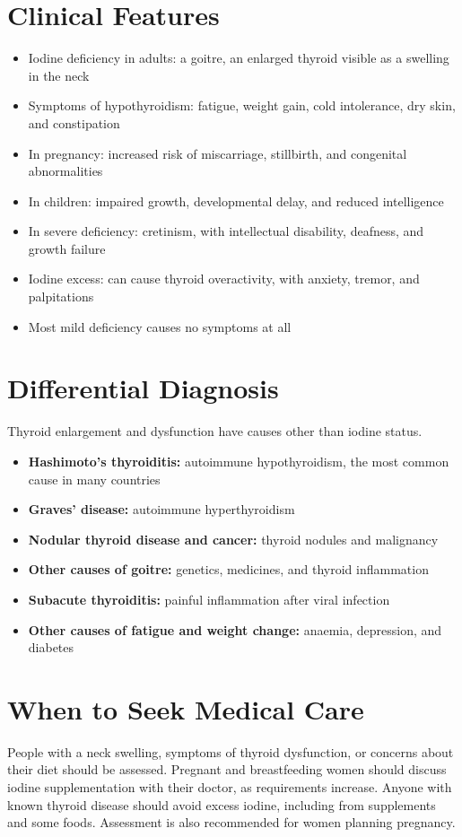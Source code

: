 \section*{Clinical Features}
\begin{itemize}
    \item Iodine deficiency in adults: a goitre, an enlarged thyroid visible as a swelling in the neck
    \item Symptoms of hypothyroidism: fatigue, weight gain, cold intolerance, dry skin, and constipation
    \item In pregnancy: increased risk of miscarriage, stillbirth, and congenital abnormalities
    \item In children: impaired growth, developmental delay, and reduced intelligence
    \item In severe deficiency: cretinism, with intellectual disability, deafness, and growth failure
    \item Iodine excess: can cause thyroid overactivity, with anxiety, tremor, and palpitations
    \item Most mild deficiency causes no symptoms at all
\end{itemize}

\section*{Differential Diagnosis}
Thyroid enlargement and dysfunction have causes other than iodine status.
\begin{itemize}
    \item \textbf{Hashimoto's thyroiditis:} autoimmune hypothyroidism, the most common cause in many countries
    \item \textbf{Graves' disease:} autoimmune hyperthyroidism
    \item \textbf{Nodular thyroid disease and cancer:} thyroid nodules and malignancy
    \item \textbf{Other causes of goitre:} genetics, medicines, and thyroid inflammation
    \item \textbf{Subacute thyroiditis:} painful inflammation after viral infection
    \item \textbf{Other causes of fatigue and weight change:} anaemia, depression, and diabetes
\end{itemize}

\section*{When to Seek Medical Care}
People with a neck swelling, symptoms of thyroid dysfunction, or concerns about their diet should be assessed. Pregnant and breastfeeding women should discuss iodine supplementation with their doctor, as requirements increase. Anyone with known thyroid disease should avoid excess iodine, including from supplements and some foods. Assessment is also recommended for women planning pregnancy.

